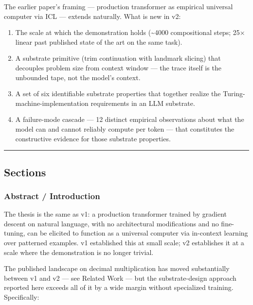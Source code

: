\documentclass[twocolumn,switch,10pt]{article}
\providecommand{\tightlist}{\setlength{\itemsep}{0pt}\setlength{\parskip}{0pt}}
\begin{document}
The earlier paper's framing --- production transformer as empirical
universal computer via ICL --- extends naturally. What is new in v2:

\begin{enumerate}
\def\labelenumi{\arabic{enumi}.}
\tightlist
\item
  The scale at which the demonstration holds (\textasciitilde4000 compositional
  steps; 25× linear past published state of the art on the same task).
\item
  A substrate primitive (trim continuation with landmark slicing) that
  decouples problem size from context window --- the trace itself is the
  unbounded tape, not the model's context.
\item
  A set of six identifiable substrate properties that together
  realize the Turing-machine-implementation requirements in an LLM
  substrate.
\item
  A failure-mode cascade --- 12 distinct empirical observations about
  what the model can and cannot reliably compute per token --- that
  constitutes the constructive evidence for those substrate
  properties.
\end{enumerate}

\begin{center}\rule{0.5\linewidth}{0.5pt}\end{center}

\subsection{Sections}\label{sections}

\subsubsection{Abstract / Introduction}\label{abstract-introduction}

The thesis is the same as v1: a production transformer trained by
gradient descent on natural language, with no architectural
modifications and no fine-tuning, can be elicited to function as a
universal computer via in-context learning over patterned examples.
v1 established this at small scale; v2 establishes it at a scale where
the demonstration is no longer trivial.

The published landscape on decimal multiplication has moved
substantially between v1 and v2 --- see Related Work --- but the
substrate-design approach reported here exceeds all of it by a wide
margin without specialized training. Specifically:
\end{document}
